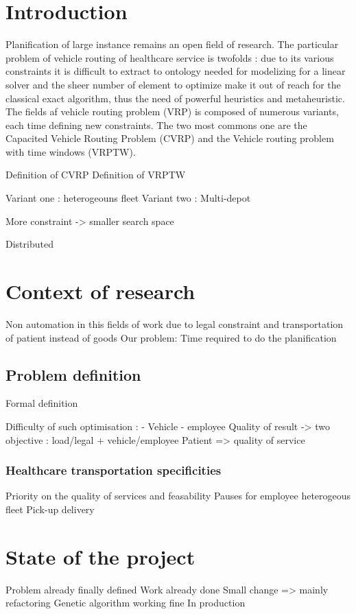 \documentclass[12pt]{memoir}
\begin{document}
\section{Introduction}
Planification of large instance remains an open field of research. The particular
problem of vehicle routing of healthcare service is twofolds : due to its
various constraints it is difficult to extract to ontology needed for modelizing for
a linear solver and the sheer number of element to optimize make it out of reach for
the classical exact algorithm, thus the need of powerful heuristics and 
metaheuristic. The fields af vehicle routing problem (VRP) is composed of numerous variants, each time defining new constraints. The two most commons one are the Capacited Vehicle Routing Problem (CVRP) and the Vehicle routing problem with time windows (VRPTW).

Definition of CVRP
Definition of VRPTW

Variant one : heterogeouns fleet
Variant two : Multi-depot

More constraint -> smaller search space

Distributed 

\section{Context of research}
\label{sec:Context of research}
Non automation in this fields of work due to legal constraint and transportation of patient instead of goods
Our problem:
Time required to do the planification

\subsection{Problem definition}
Formal definition

Difficulty of such optimisation : - Vehicle
- employee
Quality of result
-> two objective : load/legal + vehicle/employee
Patient => quality of service

\subsubsection{Healthcare transportation specificities}
\label{sub:Healthcare transportation specificities}
Priority on the quality of services and feasability
Pauses for employee
heterogeous fleet
Pick-up delivery


\section{State of the project}
Problem already finally defined 
Work already done
Small change => mainly refactoring
Genetic algorithm working fine 
In production
\end{document}
